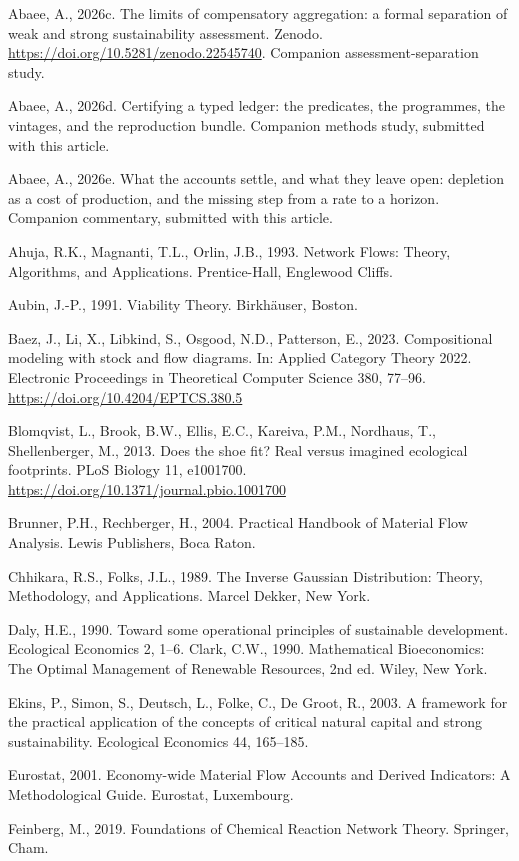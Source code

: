 \documentclass[11pt]{article}
\begin{document}
Abaee, A., 2026c. The limits of compensatory aggregation: a formal separation of weak and strong sustainability assessment. Zenodo. \url{https://doi.org/10.5281/zenodo.22545740}. Companion assessment-separation study.

Abaee, A., 2026d. Certifying a typed ledger: the predicates, the programmes, the vintages, and the reproduction bundle. Companion methods study, submitted with this article.

Abaee, A., 2026e. What the accounts settle, and what they leave open: depletion as a cost of production, and the missing step from a rate to a horizon. Companion commentary, submitted with this article.

Ahuja, R.K., Magnanti, T.L., Orlin, J.B., 1993. Network Flows: Theory, Algorithms, and Applications. Prentice-Hall, Englewood Cliffs.

Aubin, J.-P., 1991. Viability Theory. Birkh\"{a}user, Boston.

Baez, J., Li, X., Libkind, S., Osgood, N.D., Patterson, E., 2023. Compositional modeling with stock and flow diagrams. In: Applied Category Theory 2022. Electronic Proceedings in Theoretical Computer Science 380, 77--96. \url{https://doi.org/10.4204/EPTCS.380.5}

Blomqvist, L., Brook, B.W., Ellis, E.C., Kareiva, P.M., Nordhaus, T., Shellenberger, M., 2013. Does the shoe fit? Real versus imagined ecological footprints. PLoS Biology 11, e1001700. \url{https://doi.org/10.1371/journal.pbio.1001700}

Brunner, P.H., Rechberger, H., 2004. Practical Handbook of Material Flow Analysis. Lewis Publishers, Boca Raton.

Chhikara, R.S., Folks, J.L., 1989. The Inverse Gaussian Distribution: Theory, Methodology, and Applications. Marcel Dekker, New York.

Daly, H.E., 1990. Toward some operational principles of sustainable development. Ecological Economics 2, 1--6. Clark, C.W., 1990. Mathematical Bioeconomics: The Optimal Management of Renewable Resources, 2nd ed. Wiley, New York.

Ekins, P., Simon, S., Deutsch, L., Folke, C., De Groot, R., 2003. A framework for the practical application of the concepts of critical natural capital and strong sustainability. Ecological Economics 44, 165--185.

Eurostat, 2001. Economy-wide Material Flow Accounts and Derived Indicators: A Methodological Guide. Eurostat, Luxembourg.

Feinberg, M., 2019. Foundations of Chemical Reaction Network Theory. Springer, Cham.
\end{document}
